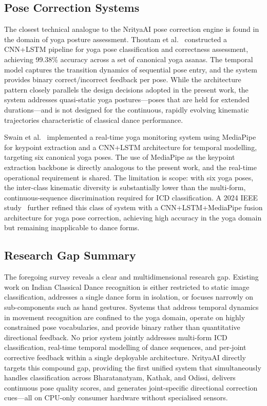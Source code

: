 \documentclass[journal]{IEEEtran}
\begin{document}
\subsection{Pose Correction Systems}

The closest technical analogue to the NrityaAI pose correction engine
is found in the domain of yoga posture assessment. Thoutam et
al.~\cite{thoutam2022} constructed a CNN+LSTM pipeline for yoga pose
classification and correctness assessment, achieving 99.38\% accuracy
across a set of canonical yoga asanas. The temporal model captures the
transition dynamics of sequential pose entry, and the system provides
binary correct/incorrect feedback per pose. While the architecture
pattern closely parallels the design decisions adopted in the present
work, the system addresses quasi-static yoga postures—poses that are
held for extended durations—and is not designed for the continuous,
rapidly evolving kinematic trajectories characteristic of classical
dance performance.

Swain et al.~\cite{swain2022} implemented a real-time yoga monitoring
system using MediaPipe for keypoint extraction and a CNN+LSTM
architecture for temporal modelling, targeting six canonical yoga
poses. The use of MediaPipe as the keypoint extraction backbone is
directly analogous to the present work, and the real-time operational
requirement is shared. The limitation is scope: with six yoga poses,
the inter-class kinematic diversity is substantially lower than the
multi-form, continuous-sequence discrimination required for ICD
classification. A 2024 IEEE study~\cite{yogavision2024} further
refined this class of system with a CNN+LSTM+MediaPipe fusion
architecture for yoga pose correction, achieving high accuracy in
the yoga domain but remaining inapplicable to dance forms.

\subsection{Research Gap Summary}

The foregoing survey reveals a clear and multidimensional research gap.
Existing work on Indian Classical Dance recognition is either restricted
to static image classification, addresses a single dance form in
isolation, or focuses narrowly on sub-components such as hand gestures.
Systems that address temporal dynamics in movement recognition are
confined to the yoga domain, operate on highly constrained pose
vocabularies, and provide binary rather than quantitative directional
feedback. No prior system jointly addresses multi-form ICD
classification, real-time temporal modelling of dance sequences, and
per-joint corrective feedback within a single deployable architecture.
NrityaAI directly targets this compound gap, providing the first unified
system that simultaneously handles classification across Bharatanatyam,
Kathak, and Odissi, delivers continuous pose quality scores, and
generates joint-specific directional correction cues—all on
CPU-only consumer hardware without specialised sensors.
\end{document}
